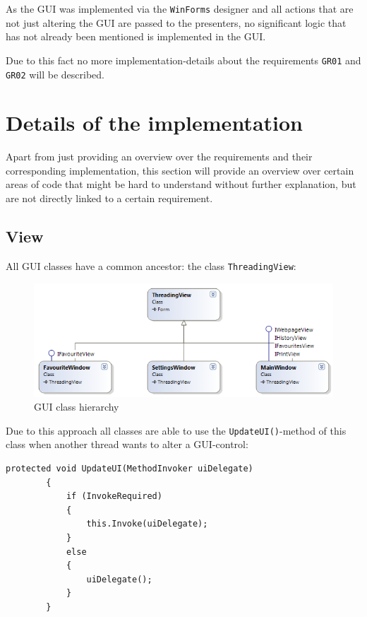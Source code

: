 As the \ac{GUI} was implemented via the \texttt{WinForms} designer and all actions that are not just altering the \ac{GUI} are passed to the presenters, no significant logic that has not already been mentioned is implemented in the \ac{GUI}.

Due to this fact no more implementation-details about the requirements \texttt{GR01} and \texttt{GR02} will be described.

\section{Details of the implementation}
\label{sec:details_implementation}

Apart from just providing an overview over the requirements and their corresponding implementation, this section will provide an overview over certain areas of code that might be hard to understand without further explanation, but are not directly linked to a certain requirement.

\subsection{View}
\label{subsubsec:view}

All \ac{GUI} classes have a common ancestor: the class \texttt{ThreadingView}:

\begin{figure}[H]
\begin{center}
\includegraphics[width=\textwidth]{gfx/view_diagram.png}
\caption{\ac{GUI} class hierarchy}
\label{fig:view_diagram}
\end{center}
\end{figure}

Due to this approach all classes are able to use the \texttt{UpdateUI()}-method of this class when another thread wants to alter a \ac{GUI}-control:

\begin{lstlisting}[caption=Updating the \ac{GUI} from the \ac{GUI}-thread.]
protected void UpdateUI(MethodInvoker uiDelegate)
        {
            if (InvokeRequired)
            {
                this.Invoke(uiDelegate);
            }
            else
            {
                uiDelegate();
            }
        }
\end{lstlisting}

